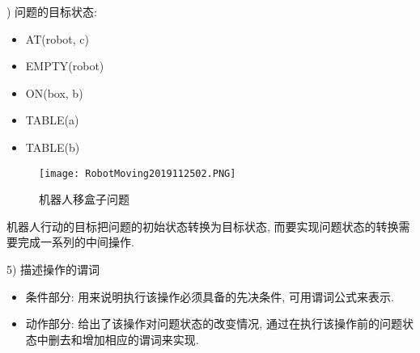 \begin{example}
\begin{minipage}{13.5cm}
{) 问题的目标状态:}
\begin{minipage}{4.5cm}
\begin{itemize}
\item AT(robot, c)
\item EMPTY(robot)
\item ON(box, b)
\item TABLE(a)
\item TABLE(b)
\end{itemize}
\end{minipage}
\begin{minipage}{6cm}
\begin{figure}[H]
\centering
\texttt{[image: RobotMoving2019112502.PNG]}
\caption{机器人移盒子问题}
\label{AI32fig02}
\end{figure}
\end{minipage}
\end{minipage}

机器人行动的目标把问题的初始状态转换为目标状态, 而要实现问题状态的转换需要完成一系列的中间操作.

5) 描述操作的谓词
\begin{itemize}
    \item 条件部分: 用来说明执行该操作必须具备的先决条件, 可用谓词公式来表示.
    \item 动作部分: 给出了该操作对问题状态的改变情况, 通过在执行该操作前的问题状态中删去和增加相应的谓词来实现.
\end{itemize}


\end{example}
